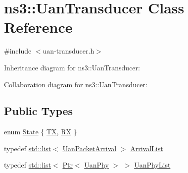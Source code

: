 \hypertarget{classns3_1_1UanTransducer}{}\section{ns3\+:\+:Uan\+Transducer Class Reference}
\label{classns3_1_1UanTransducer}


{\ttfamily \#include $<$uan-\/transducer.\+h$>$}



Inheritance diagram for ns3\+:\+:Uan\+Transducer\+:


Collaboration diagram for ns3\+:\+:Uan\+Transducer\+:
\subsection*{Public Types}
\begin{DoxyCompactItemize}
\item 
enum \hyperlink{classns3_1_1UanTransducer_a037314c27ca07c9c6234460086058bce}{State} \{ \hyperlink{classns3_1_1UanTransducer_a037314c27ca07c9c6234460086058bceaebb4d4341dddeff74e7a91632d6b5f4d}{TX}, 
\hyperlink{classns3_1_1UanTransducer_a037314c27ca07c9c6234460086058bcea7f900390ec167f157963a7147db7ab2b}{RX}
 \}
\item 
typedef \hyperlink{openflow-interface_8h_afd9bcfa176617760671b67580f536fa7}{std\+::list}$<$ \hyperlink{classns3_1_1UanPacketArrival}{Uan\+Packet\+Arrival} $>$ \hyperlink{classns3_1_1UanTransducer_a95332a21e30506421a116d4b5c4dfd75}{Arrival\+List}
\item 
typedef \hyperlink{openflow-interface_8h_afd9bcfa176617760671b67580f536fa7}{std\+::list}$<$ \hyperlink{classns3_1_1Ptr}{Ptr}$<$ \hyperlink{classns3_1_1UanPhy}{Uan\+Phy} $>$ $>$ \hyperlink{classns3_1_1UanTransducer_a3bac0e2447ad40f48533d14b10d01212}{Uan\+Phy\+List}
\end{DoxyCompactItemize}
